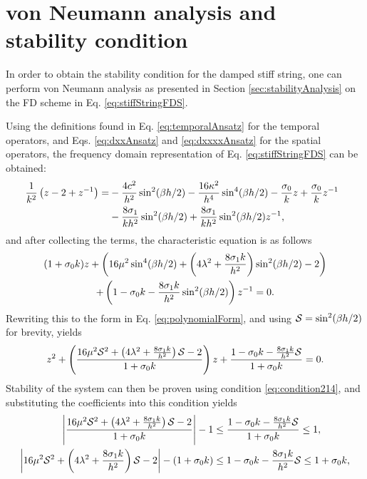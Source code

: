 {\section{von Neumann analysis and stability condition}\label{sec:stiffStringStability}
In order to obtain the stability condition for the damped stiff string, one can perform von Neumann analysis as presented in Section \ref{sec:stabilityAnalysis} on the FD scheme in Eq. \eqref{eq:stiffStringFDS}.

Using the definitions found in Eq. \eqref{eq:temporalAnsatz} for the temporal operators, and Eqs. \eqref{eq:dxxAnsatz} and \eqref{eq:dxxxxAnsatz} for the spatial operators, the frequency domain representation of Eq. \eqref{eq:stiffStringFDS} can be obtained:
\begin{align*}
    \!\!\!\!\frac{1}{k^2}\left(z - 2 + z^{-1}\right) =&-\frac{4c^2}{h^2}\sin^2(\beta h/2) - \frac{16\kappa^2}{h^4}\sin^4(\beta h/2) - \frac{\sz}{k}z + \frac{\sz}{k}z^{-1}\\
    & - \frac{8 \so}{kh^2}\sin^2(\beta h/2) + \frac{8 \so}{kh^2} \sin^2(\beta h/2)z^{-1},
\end{align*}
and after collecting the terms, the characteristic equation is as follows
\begin{gather}
    (1+\sz k)z + \left(16\mu^2\sin^4(\beta h/2)+\left(4\lambda^2+\frac{8\so k}{h^2}\right)\sin^2(\beta h/2) - 2\right)\nonumber\\
    +\left(1-\sz k-\frac{8\so k}{h^2}\sin^2(\beta h/2)\right)z^{-1}=0.\label{eq:charDampedString}
\end{gather}
Rewriting this to the form in Eq. \eqref{eq:polynomialForm}, and using $\S = \sin^2(\beta h /2)$ for brevity, yields
\begin{equation*}
    z^2 + \left(\frac{16\mu^2\S^2+\left(4\lambda^2+\frac{8\so k}{h^2}\right)\S - 2}{1 + \sz k}\right)z+\frac{1-\sz k-\frac{8\so k}{h^2}\S}{1 + \sz k}=0.
\end{equation*}
Stability of the system can then be proven using condition \eqref{eq:condition214}, and substituting the coefficients into this condition yields
\begin{equation}\nonumber
    \begin{aligned}
        \left|\frac{16\mu^2\S^2+\left(4\lambda^2+\frac{8\so k}{h^2}\right)\S - 2}{1+\sz k}\right|-1 &\leq \frac{1-\sz k-\frac{8\so k}{h^2}\S}{1+\sz k}\leq 1,\\
        \left|16\mu^2\S^2+\left(4\lambda^2+\frac{8\so k}{h^2}\right)\S - 2\right|-(1+\sz k) &\leq 1-\sz k-\frac{8\so k}{h^2}\S\leq 1+\sz k,\\

\end{aligned}
\end{equation}}
